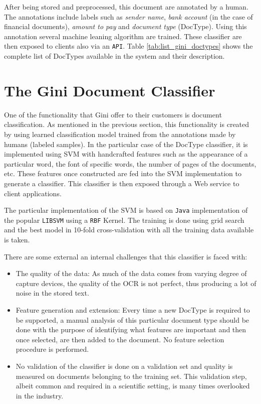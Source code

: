 After being stored and preprocessed, this document are annotated by a human.
The annotations include labels such as  \textit{sender name}, \textit{bank
  account} (in the case of financial documents), \textit{amount to pay} and
\textit{document type} (\ac{DocType}). Using this annotation several
machine leaning algorithm are trained.  These classifier are then exposed to
clients also via an \texttt{API}. Table \ref{tab:list_gini_doctypes} shows the
complete list of \ac{DocType}s available in the system and their description.


\section{The Gini Document Classifier}  
\label{sec:gini_doctype_classifier}

One of the functionality that Gini offer to their customers is document
classification.  As mentioned in the previous section, this functionality is
created by  using learned classification model trained from  the annotations
made by humans (labeled samples). In the particular
case of the \ac{DocType} classifier, it is implemented using \ac{SVM} with
handcrafted features such as the appearance of a particular word, the font
of specific words, the number of pages of the documents, etc. These features
once constructed are fed into the \ac{SVM} implementation to generate a classifier. This
classifier is then exposed through a Web service to client applications.

The particular implementation of the \ac{SVM} is based on \texttt{Java}
implementation of the popular \texttt{LIBSVM} \cite{CC01a} using a
\texttt{RBF} Kernel.  The training is done using grid search and the best
model in 10-fold cross-validation with all the training data available is
taken.

There are some external an internal challenges that this classifier is faced
with:

\begin{itemize}
\item The quality of the data: As much of the data comes from varying degree
  of capture devices, the quality of the OCR is not perfect, thus producing a
  lot of noise in the stored text.
\item Feature generation and extension: Every time a new \ac{DocType} is
  required to be supported, a manual analysis of this particular document type should be
  done with the purpose of identifying what features are important and then
  once selected, are then added to the document. No feature selection
  procedure is performed.
\item No validation of the classifier is done on a validation set and quality
  is measured on documents belonging to the training set. This validation step, albeit common and required  in a scientific setting, is many times overlooked in
  the industry.
\end{itemize}

